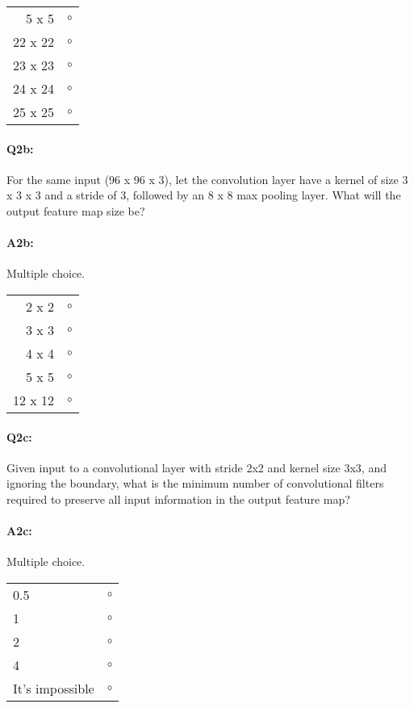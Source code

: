 \begin{tabular}[h]{rr}
\toprule
5 x 5     & $\circ$ \\  %
22 x 22 & $\circ$ \\
23 x 23 & $\circ$ \\
24 x 24 & $\circ$ \\
25 x 25 & $\circ$ \\
\bottomrule
\end{tabular}

\paragraph{Q2b:} For the same input (96 x 96 x 3), let the convolution layer have a kernel of size 3 x 3 x 3 and a stride of 3, followed by an 8 x 8 max pooling layer. What will the output feature map size be? 

\paragraph{A2b:} Multiple choice.

\begin{tabular}[h]{rr}
\toprule
2 x 2 & $\circ$ \\
3 x 3 & $\circ$ \\
4 x 4 & $\circ$ \\
5 x 5 & $\circ$ \\
12 x 12 & $\circ$ \\
\bottomrule
\end{tabular}

\paragraph{Q2c:} Given input to a convolutional layer with stride 2x2 and kernel size 3x3, and ignoring the boundary, what is the minimum number of convolutional filters required to preserve all input information in the output feature map?

\paragraph{A2c:} Multiple choice.

\begin{tabular}[h]{lc}
\toprule
0.5 & $\circ$ \\
1 & $\circ$ \\
2 & $\circ$ \\
4 & $\circ$ \\
It's impossible & $\circ$ \\
\bottomrule
\end{tabular}

